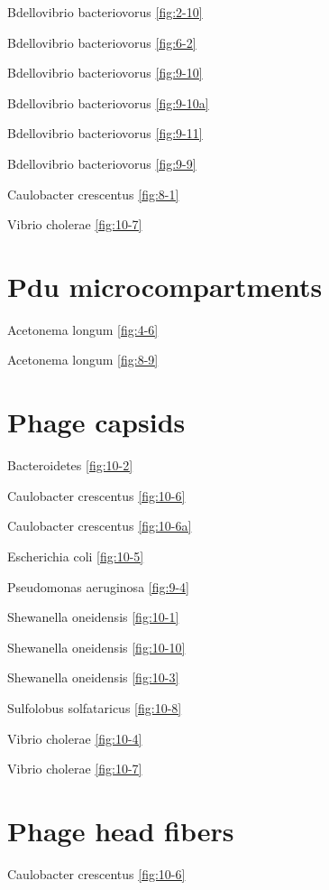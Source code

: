 \documentclass[]{tufte-book}
\begin{document}
Bdellovibrio bacteriovorus \ref{fig:2-10}

Bdellovibrio bacteriovorus \ref{fig:6-2}

Bdellovibrio bacteriovorus \ref{fig:9-10}

Bdellovibrio bacteriovorus \ref{fig:9-10a}

Bdellovibrio bacteriovorus \ref{fig:9-11}

Bdellovibrio bacteriovorus \ref{fig:9-9}

Caulobacter crescentus \ref{fig:8-1}

Vibrio cholerae \ref{fig:10-7}

\section*{Pdu microcompartments}\label{pdu-microcompartments}

Acetonema longum \ref{fig:4-6}

Acetonema longum \ref{fig:8-9}

\section*{Phage capsids}\label{phage-capsids}

Bacteroidetes \ref{fig:10-2}

Caulobacter crescentus \ref{fig:10-6}

Caulobacter crescentus \ref{fig:10-6a}

Escherichia coli \ref{fig:10-5}

Pseudomonas aeruginosa \ref{fig:9-4}

Shewanella oneidensis \ref{fig:10-1}

Shewanella oneidensis \ref{fig:10-10}

Shewanella oneidensis \ref{fig:10-3}

Sulfolobus solfataricus \ref{fig:10-8}

Vibrio cholerae \ref{fig:10-4}

Vibrio cholerae \ref{fig:10-7}

\section*{Phage head fibers}\label{phage-head-fibers}

Caulobacter crescentus \ref{fig:10-6}
\end{document}
